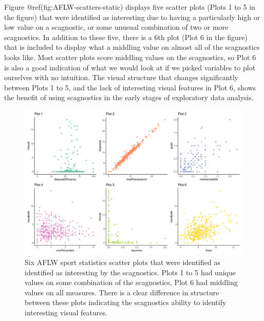 Figure @ref(fig:AFLW-scatters-static) displays five scatter plots (Plots
1 to 5 in the figure) that were identified as interesting due to having
a particularly high or low value on a scagnostic, or some unusual
combination of two or more scagnostics. In addition to these five, there
is a 6th plot (Plot 6 in the figure) that is included to display what a
middling value on almost all of the scagnostics looks like. Most scatter
plots score middling values on the scagnostics, so Plot 6 is also a good
indication of what we would look at if we picked variables to plot
ourselves with no intuition. The visual structure that changes
significantly between Plots 1 to 5, and the lack of interesting visual
features in Plot 6, shows the benefit of using scagnostics in the early
stages of exploratory data analysis.

\begin{Schunk}
\begin{figure}

{\centering \includegraphics[width=1\linewidth]{mason-lee-laa-cook_files/figure-latex/AFLW-scatters-static-1} 

}

\caption[Six AFLW sport statistics scatter plots that were identified as identified as interesting by the scagnostics]{Six AFLW sport statistics scatter plots that were identified as identified as interesting by the scagnostics. Plots 1 to 5 had unique values on some combination of the scagnostics, Plot 6 had middling values on all measures. There is a clear difference in structure between these plots indicating the scagnostics ability to identify interesting visual features.}\label{fig:AFLW-scatters-static}
\end{figure}
\end{Schunk}

